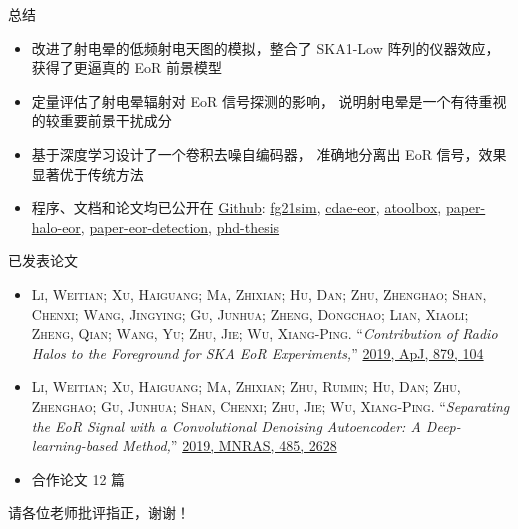 \documentclass{beamer}
\begin{document}
\begin{frame}{总\cspace{}结}
  \begin{itemize}
    \item 改进了射电晕的低频射电天图的模拟，整合了 SKA1-Low 阵列的仪器效应，
      获得了更逼真的 EoR 前景模型
    \item 定量评估了射电晕辐射对 EoR 信号探测的影响，
      说明射电晕是一个有待重视的较重要前景干扰成分
    \item 基于深度学习设计了一个卷积去噪自编码器，
      准确地分离出 EoR 信号，效果显著优于传统方法
    \item 程序、文档和论文均已公开在
      \href{https://github.com/liweitianux/}{Github}:
      \href{https://github.com/liweitianux/fg21sim}{fg21sim},
      \href{https://github.com/liweitianux/cdae-eor}{cdae-eor},
      \href{https://github.com/liweitianux/atoolbox}{atoolbox},
      \href{https://github.com/liweitianux/paper-halo-eor}{paper-halo-eor},
      \href{https://github.com/liweitianux/paper-eor-detection}{paper-eor-detection},
      \href{https://github.com/liweitianux/phd-thesis}{phd-thesis}
  \end{itemize}
\end{frame}

\begin{frame}{已发表论文}
  \small
  \begin{itemize}
    \item
      \textsc{\alert{Li, Weitian}; Xu, Haiguang; Ma, Zhixian; Hu, Dan;
      Zhu, Zhenghao; Shan, Chenxi; Wang, Jingying; Gu, Junhua;
      Zheng, Dongchao; Lian, Xiaoli; Zheng, Qian; Wang, Yu;
      Zhu, Jie; Wu, Xiang-Ping}.
      \enquote{\it Contribution of Radio Halos to the Foreground for
        SKA EoR Experiments,}
      \href{http://adsabs.harvard.edu/abs/2019ApJ...879..104L}{%
        2019, ApJ, 879, 104}
    \item
      \textsc{\alert{Li, Weitian}; Xu, Haiguang; Ma, Zhixian; Zhu, Ruimin;
      Hu, Dan; Zhu, Zhenghao; Gu, Junhua; Shan, Chenxi; Zhu, Jie;
      Wu, Xiang-Ping}.
      \enquote{\it Separating the EoR Signal with a Convolutional Denoising
        Autoencoder: A Deep-learning-based Method,}
      \href{http://adsabs.harvard.edu/abs/2019MNRAS.485.2628L}{%
        2019, MNRAS, 485, 2628}
    \item
      合作论文 12 篇
  \end{itemize}
\end{frame}

\begin{frame}[standout]
  \huge 请各位老师批评指正，谢谢！
\end{frame}
\end{document}

